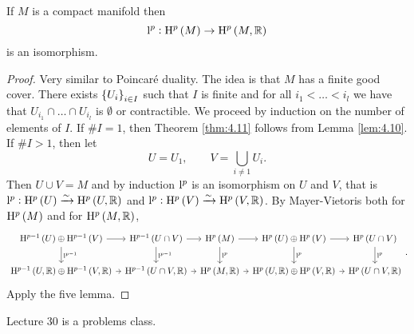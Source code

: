 \begin{theorem}
\label{thm:4.11}
If $ M $ is a compact manifold then
$$ \l^p : \H^p\br{M} \to \H^p\br{M, \RR} $$
is an isomorphism.
\end{theorem}

\begin{proof}
Very similar to Poincar\'e duality. The idea is that $ M $ has a finite good cover. There exists $ \cbr{U_i}_{i \in I} $ such that $ I $ is finite and for all $ i_1 < \dots < i_l $ we have that $ U_{i_1} \cap \dots \cap U_{i_l} $ is $ \emptyset $ or contractible. We proceed by induction on the number of elements of $ I $. If $ \#I = 1 $, then Theorem \ref{thm:4.11} follows from Lemma \ref{lem:4.10}. If $ \#I > 1 $, then let
$$ U = U_1, \qquad V = \bigcup_{i \ne 1} U_i. $$
Then $ U \cup V = M $ and by induction $ \mathrm{l}^p $ is an isomorphism on $ U $ and $ V $, that is $ \l^p : \H^p\br{U} \xrightarrow{\sim} \H^p\br{U, \RR} $ and $ \l^p : \H^p\br{V} \xrightarrow{\sim} \H^p\br{V, \RR} $. By Mayer-Vietoris both for $ \H^p\br{M} $ and for $ \H^p\br{M, \RR} $,
$$
\begin{tikzcd}[column sep=tiny]
\H^{p - 1}\br{U} \oplus \H^{p - 1}\br{V} \arrow{r} \arrow{d}{\l^{p - 1}} & \H^{p - 1}\br{U \cap V} \arrow{r} \arrow{d}{\l^{p - 1}} & \H^p\br{M} \arrow{r} \arrow{d}{\l^p} & \H^p\br{U} \oplus \H^p\br{V} \arrow{r} \arrow{d}{\l^p} & \H^p\br{U \cap V} \arrow{d}{\l^p} \\
\H^{p - 1}\br{U, \RR} \oplus \H^{p - 1}\br{V, \RR} \arrow{r} & \H^{p - 1}\br{U \cap V, \RR} \arrow{r} & \H^p\br{M, \RR} \arrow{r} & \H^p\br{U, \RR} \oplus \H^p\br{V, \RR} \arrow{r} & \H^p\br{U \cap V, \RR}
\end{tikzcd}.
$$
Apply the five lemma.
\end{proof}


Lecture 30 is a problems class.

